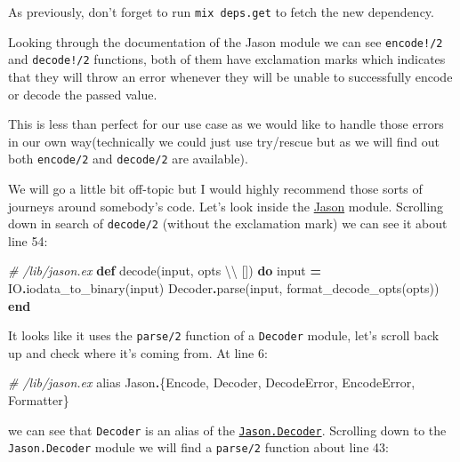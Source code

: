 \documentclass[
  oneside]{book}
\newenvironment{Shaded}{\begin{snugshade}}{\end{snugshade}}
\newcommand{\CommentTok}[1]{\textcolor[rgb]{0.56,0.35,0.01}{\textit{#1}}}
\newcommand{\ConstantTok}[1]{\textcolor[rgb]{0.00,0.00,0.00}{#1}}
\newcommand{\ImportTok}[1]{#1}
\newcommand{\KeywordTok}[1]{\textcolor[rgb]{0.13,0.29,0.53}{\textbf{#1}}}
\newcommand{\NormalTok}[1]{#1}
\newcommand{\OperatorTok}[1]{\textcolor[rgb]{0.81,0.36,0.00}{\textbf{#1}}}
\begin{document}
As previously, don't forget to run \texttt{mix\ deps.get} to fetch the new dependency.

Looking through the documentation of the Jason module we can see \texttt{encode!/2} and \texttt{decode!/2} functions, both of them have exclamation marks which indicates that they will throw an error whenever they will be unable to successfully encode or decode the passed value.

This is less than perfect for our use case as we would like to handle those errors in our own way(technically we could just use try/rescue but as we will find out both \texttt{encode/2} and \texttt{decode/2} are available).

We will go a little bit off-topic but I would highly recommend those sorts of journeys around somebody's code. Let's look inside the \href{https://github.com/michalmuskala/jason/blob/master/lib/jason.ex}{Jason} module. Scrolling down in search of \texttt{decode/2} (without the exclamation mark) we can see it about line 54:

\begin{Shaded}
\begin{Highlighting}[]
  \CommentTok{\# /lib/jason.ex}
  \KeywordTok{def}\NormalTok{ decode(input, opts \textbackslash{}\textbackslash{} []) }\KeywordTok{do}
\NormalTok{    input }\OperatorTok{=} \ConstantTok{IO}\OperatorTok{.}\NormalTok{iodata\_to\_binary(input)}
    \ConstantTok{Decoder}\OperatorTok{.}\NormalTok{parse(input, format\_decode\_opts(opts))}
  \KeywordTok{end}
\end{Highlighting}
\end{Shaded}

It looks like it uses the \texttt{parse/2} function of a \texttt{Decoder} module, let's scroll back up and check where it's coming from. At line 6:

\begin{Shaded}
\begin{Highlighting}[]
\CommentTok{\# /lib/jason.ex}
\ImportTok{alias} \ConstantTok{Jason}\OperatorTok{.}\NormalTok{\{}\ConstantTok{Encode}\NormalTok{, }\ConstantTok{Decoder}\NormalTok{, }\ConstantTok{DecodeError}\NormalTok{, }\ConstantTok{EncodeError}\NormalTok{, }\ConstantTok{Formatter}\NormalTok{\}}
\end{Highlighting}
\end{Shaded}

we can see that \texttt{Decoder} is an alias of the \href{https://github.com/michalmuskala/jason/blob/master/lib/decoder.ex}{\texttt{Jason.Decoder}}. Scrolling down to the \texttt{Jason.Decoder} module we will find a \texttt{parse/2} function about line 43:
\end{document}
